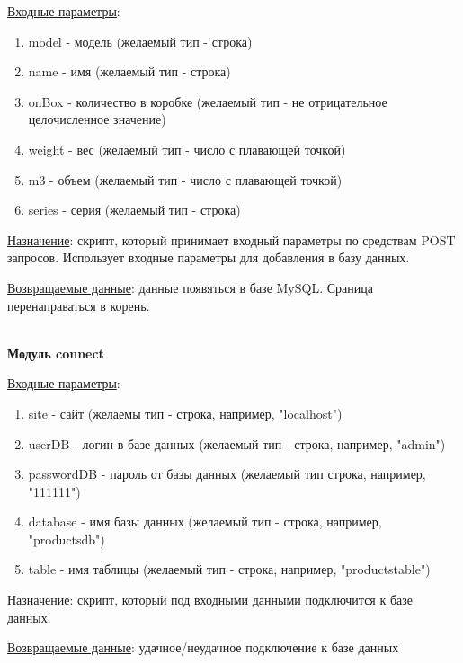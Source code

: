 \underline{Входные параметры}:

\begin{enumerate}
    \item model - модель (желаемый тип - строка)
    \item name - имя (желаемый тип - строка)
    \item onBox - количество в коробке (желаемый тип - не отрицательное целочисленное значение)
    \item weight - вес (желаемый тип - число с плавающей точкой)
    \item m3 - объем (желаемый тип - число с плавающей точкой)     
    \item series - серия (желаемый тип - строка) 
\end{enumerate}

\underline{Назначение}: скрипт, который принимает входный параметры по средствам POST запросов. Использует входные параметры для добавления в базу данных.

\underline{Возвращаемые данные}: данные появяться в базе MySQL. Сраница перенаправаться в корень.

\hspace{0pt}\\


\textbf{Модуль connect}

\underline{Входные параметры}:

\begin{enumerate}
    \item site - сайт (желаемы тип - строка, например,  "localhost")
    \item userDB - логин в базе данных (желаемый тип - строка, например, "admin")
    \item passwordDB - пароль от базы данных (желаемый тип строка, например, "111111")
    \item database - имя базы данных (желаемый тип - строка, например, "productsdb")
    \item table - имя таблицы (желаемый тип - строка, например, "productstable")
\end{enumerate}

\underline{Назначение}: скрипт, который под входными данными подключится к базе данных.

\underline{Возвращаемые данные}: удачное/неудачное подключение к базе данных

\hspace{0pt}\\

